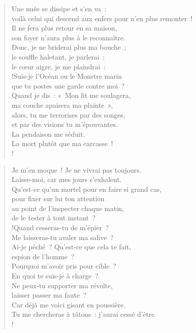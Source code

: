 \documentclass[french,twoside]{book} %
\def\mednobreak{\ifdim\lastskip<\medskipamount
  \removelastskip\nopagebreak\medskip\fi}
\newcommand{\labelblock}[1]{\medbreak{\noindent\color{rubric}\bfseries #1}\par\mednobreak}
\newcommand\chapterclose{} %
\begin{document}
\begin{verse}
Une nuée se dissipe et s’en va : \\
voilà celui qui descend aux enfers pour n’en plus remonter !\\
Il ne fera plus retour en sa maison, \\
son foyer n’aura plus à le reconnaître.\\
Donc, je ne briderai plus ma bouche ; \\
le souffle haletant, je parlerai ; \\
le cœur aigre, je me plaindrai :\\!Suis-je l’Océan ou le Monstre marin \\
que tu postes une garde contre moi ?\\
Quand je dis : « Mon lit me soulagera, \\
ma couche apaisera ma plainte »,\\
alors, tu me terrorises par des songes, \\
et par des visions tu m’épouvantes.\\
La pendaison me séduit. \\
La mort plutôt que ma carcasse !\\!
\end{verse}

\labelblock{Echec de Dieu}


\begin{verse}
Je m’en moque ! Je ne vivrai pas toujours. \\
Laisse-moi, car mes jours s’exhalent.\\
Qu’est-ce qu’un mortel pour en faire si grand cas, \\
pour fixer sur lui ton attention\\
au point de l’inspecter chaque matin, \\
de le tester à tout instant ?\\!Quand cesseras-tu de m’épier ? \\
Me laisseras-tu avaler ma salive ?\\
Ai-je péché ? Qu’est-ce que cela te fait, \\
espion de l’homme ? \\
Pourquoi m’avoir pris pour cible ? \\
En quoi te suis-je à charge ?\\
Ne peux-tu supporter ma révolte, \\
laisser passer ma faute ? \\
Car déjà me voici gisant en poussière. \\
Tu me chercheras à tâtons : j’aurai cessé d’être.\\!
\end{verse}
\chapterclose
\end{document}
